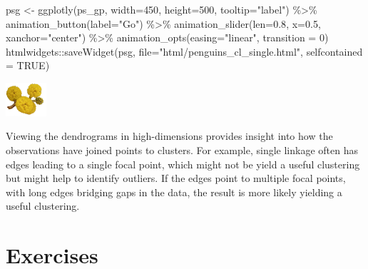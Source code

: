 \documentclass[
  letterpaper,
]{krantz}
\newenvironment{Shaded}{\begin{snugshade}}{\end{snugshade}}
\newcommand{\AttributeTok}[1]{\textcolor[rgb]{0.40,0.45,0.13}{#1}}
\newcommand{\ConstantTok}[1]{\textcolor[rgb]{0.56,0.35,0.01}{#1}}
\newcommand{\DecValTok}[1]{\textcolor[rgb]{0.68,0.00,0.00}{#1}}
\newcommand{\FloatTok}[1]{\textcolor[rgb]{0.68,0.00,0.00}{#1}}
\newcommand{\FunctionTok}[1]{\textcolor[rgb]{0.28,0.35,0.67}{#1}}
\newcommand{\NormalTok}[1]{\textcolor[rgb]{0.00,0.23,0.31}{#1}}
\newcommand{\OtherTok}[1]{\textcolor[rgb]{0.00,0.23,0.31}{#1}}
\newcommand{\SpecialCharTok}[1]{\textcolor[rgb]{0.37,0.37,0.37}{#1}}
\newcommand{\StringTok}[1]{\textcolor[rgb]{0.13,0.47,0.30}{#1}}
\newcommand{\infobox}[1]{%
\noindent\colorbox{info!30}{%
\begin{minipage}{0.98\linewidth}%
    \centering%
    \begin{minipage}[c]{0.15\linewidth} %
      \includegraphics[width=1.5cm]{images/mulga-flowers2.png} %
    \end{minipage}%
    \hfill %
    \begin{minipage}[c]{0.8\linewidth} %
      \bigskip%
      \textsf{#1}%
      \bigskip%
    \end{minipage}%
    \hspace*{3mm}%
  \end{minipage}%
}%
}
\begin{document}
\begin{Shaded}
\begin{Highlighting}[]
\NormalTok{psg }\OtherTok{\textless{}{-}} \FunctionTok{ggplotly}\NormalTok{(ps\_gp, }\AttributeTok{width=}\DecValTok{450}\NormalTok{, }\AttributeTok{height=}\DecValTok{500}\NormalTok{,}
                \AttributeTok{tooltip=}\StringTok{"label"}\NormalTok{) }\SpecialCharTok{\%\textgreater{}\%}
       \FunctionTok{animation\_button}\NormalTok{(}\AttributeTok{label=}\StringTok{"Go"}\NormalTok{) }\SpecialCharTok{\%\textgreater{}\%}
       \FunctionTok{animation\_slider}\NormalTok{(}\AttributeTok{len=}\FloatTok{0.8}\NormalTok{, }\AttributeTok{x=}\FloatTok{0.5}\NormalTok{,}
                        \AttributeTok{xanchor=}\StringTok{"center"}\NormalTok{) }\SpecialCharTok{\%\textgreater{}\%}
       \FunctionTok{animation\_opts}\NormalTok{(}\AttributeTok{easing=}\StringTok{"linear"}\NormalTok{, }\AttributeTok{transition =} \DecValTok{0}\NormalTok{)}
\NormalTok{htmlwidgets}\SpecialCharTok{::}\FunctionTok{saveWidget}\NormalTok{(psg,}
          \AttributeTok{file=}\StringTok{"html/penguins\_cl\_single.html"}\NormalTok{,}
          \AttributeTok{selfcontained =} \ConstantTok{TRUE}\NormalTok{)}
\end{Highlighting}
\end{Shaded}

\infobox{Viewing the dendrograms in high-dimensions provides insight into how the observations have joined points to clusters. For example, single linkage often has edges leading to a single focal point, which might not be yield a useful clustering but might help to identify outliers. If the edges point to multiple focal points, with long edges bridging gaps in the data, the result is more likely yielding a useful clustering.}

\section*{Exercises}\label{exercises-7}

\end{document}
